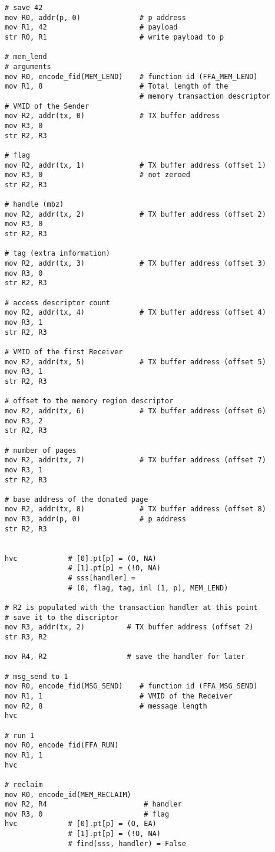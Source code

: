\documentclass{article}
\begin{document}
\begin{lstlisting}[caption={VM 0}]
# save 42
mov R0, addr(p, 0)              # p address
mov R1, 42                      # payload
str R0, R1                      # write payload to p

# mem_lend
# arguments
mov R0, encode_fid(MEM_LEND)    # function id (FFA_MEM_LEND)
mov R1, 8                       # Total length of the
                                # memory transaction descriptor
# VMID of the Sender
mov R2, addr(tx, 0)             # TX buffer address
mov R3, 0
str R2, R3

# flag
mov R2, addr(tx, 1)             # TX buffer address (offset 1)
mov R3, 0                       # not zeroed
str R2, R3

# handle (mbz)
mov R2, addr(tx, 2)             # TX buffer address (offset 2)
mov R3, 0
str R2, R3

# tag (extra information)
mov R2, addr(tx, 3)             # TX buffer address (offset 3)
mov R3, 0
str R2, R3

# access descriptor count
mov R2, addr(tx, 4)             # TX buffer address (offset 4)
mov R3, 1
str R2, R3

# VMID of the first Receiver
mov R2, addr(tx, 5)             # TX buffer address (offset 5)
mov R3, 1
str R2, R3

# offset to the memory region descriptor
mov R2, addr(tx, 6)             # TX buffer address (offset 6)
mov R3, 2
str R2, R3

# number of pages
mov R2, addr(tx, 7)             # TX buffer address (offset 7)
mov R3, 1
str R2, R3

# base address of the donated page
mov R2, addr(tx, 8)             # TX buffer address (offset 8)
mov R3, addr(p, 0)              # p address
str R2, R3


hvc            # [0].pt[p] = (O, NA)
               # [1].pt[p] = (!O, NA)
               # sss[handler] =
               # (0, flag, tag, inl (1, p), MEM_LEND)

# R2 is populated with the transaction handler at this point
# save it to the discriptor
mov R3, addr(tx, 2)          # TX buffer address (offset 2)
str R3, R2

mov R4, R2                   # save the handler for later

# msg_send to 1
mov R0, encode_fid(MSG_SEND)    # function id (FFA_MSG_SEND)
mov R1, 1                       # VMID of the Receiver
mov R2, 8                       # message length
hvc

# run 1
mov R0, encode_fid(FFA_RUN)
mov R1, 1
hvc

# reclaim
mov R0, encode_id(MEM_RECLAIM)
mov R2, R4                       # handler
mov R3, 0                        # flag
hvc            # [0].pt[p] = (O, EA)
               # [1].pt[p] = (!O, NA)
               # find(sss, handler) = False
\end{lstlisting}
\end{document}
